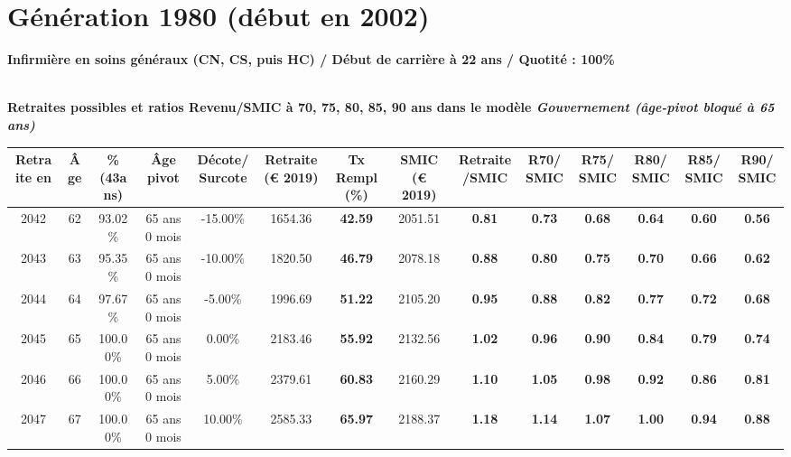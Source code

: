 \newpage 
 
\section{Génération 1980 (début en 2002)\label{Infirmier_100_22_1980_0}} 
 
{\bf \noindent Infirmière en soins généraux (CN, CS, puis HC) / Début de carrière à 22 ans / Quotité : 100\%}  ~ 

 ~\\{\bf \noindent Retraites possibles et ratios Revenu/SMIC à 70, 75, 80, 85, 90 ans dans le modèle \emph{Gouvernement (âge-pivot bloqué à 65 ans)}}  
 
\begin{adjustbox}{max width=\textwidth} 
\begin{tabular}[htb]{|c|c||c|c|c||c|c||c|c||c|c|c|c|c|} 
\hline 
 Retraite en &  Âge &  \%(43ans) &  Âge pivot &  Décote/Surcote &  Retraite (\euro{} 2019) &  Tx Rempl(\%) &  SMIC (\euro{} 2019) &  Retraite/SMIC &  R70/SMIC &  R75/SMIC &  R80/SMIC &  R85/SMIC &  R90/SMIC \\ 
\hline \hline 
 2042 &  62 &  93.02\% &  65 ans 0 mois &  -15.00\% &  1654.36 &  {\bf 42.59} &  2051.51 &  {\bf {\color{red} 0.81}} &  {\bf {\color{red} 0.73}} &  {\bf {\color{red} 0.68}} &  {\bf {\color{red} 0.64}} &  {\bf {\color{red} 0.60}} &  {\bf {\color{red} 0.56}} \\ 
\hline 
 2043 &  63 &  95.35\% &  65 ans 0 mois &  -10.00\% &  1820.50 &  {\bf 46.79} &  2078.18 &  {\bf {\color{red} 0.88}} &  {\bf {\color{red} 0.80}} &  {\bf {\color{red} 0.75}} &  {\bf {\color{red} 0.70}} &  {\bf {\color{red} 0.66}} &  {\bf {\color{red} 0.62}} \\ 
\hline 
 2044 &  64 &  97.67\% &  65 ans 0 mois &  -5.00\% &  1996.69 &  {\bf 51.22} &  2105.20 &  {\bf {\color{red} 0.95}} &  {\bf {\color{red} 0.88}} &  {\bf {\color{red} 0.82}} &  {\bf {\color{red} 0.77}} &  {\bf {\color{red} 0.72}} &  {\bf {\color{red} 0.68}} \\ 
\hline 
 2045 &  65 &  100.00\% &  65 ans 0 mois &  0.00\% &  2183.46 &  {\bf 55.92} &  2132.56 &  {\bf 1.02} &  {\bf {\color{red} 0.96}} &  {\bf {\color{red} 0.90}} &  {\bf {\color{red} 0.84}} &  {\bf {\color{red} 0.79}} &  {\bf {\color{red} 0.74}} \\ 
\hline 
 2046 &  66 &  100.00\% &  65 ans 0 mois &  5.00\% &  2379.61 &  {\bf 60.83} &  2160.29 &  {\bf 1.10} &  {\bf 1.05} &  {\bf {\color{red} 0.98}} &  {\bf {\color{red} 0.92}} &  {\bf {\color{red} 0.86}} &  {\bf {\color{red} 0.81}} \\ 
\hline 
 2047 &  67 &  100.00\% &  65 ans 0 mois &  10.00\% &  2585.33 &  {\bf 65.97} &  2188.37 &  {\bf 1.18} &  {\bf 1.14} &  {\bf 1.07} &  {\bf {\color{red} 1.00}} &  {\bf {\color{red} 0.94}} &  {\bf {\color{red} 0.88}} \\ 
\hline 
\hline 
\end{tabular} 
\end{adjustbox} 
 
